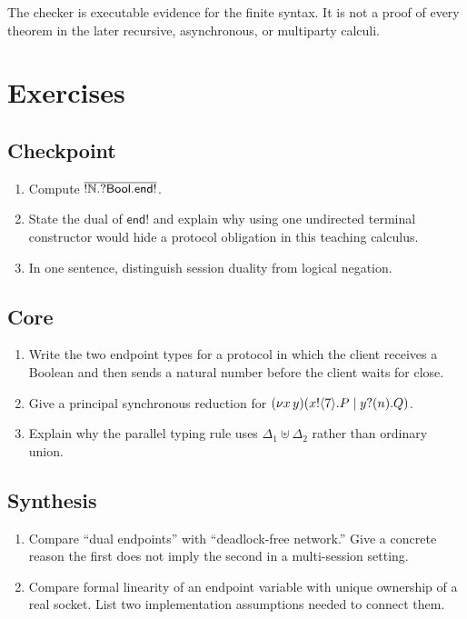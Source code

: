 The checker is executable evidence for the finite syntax. It is not a proof of every theorem in
the later recursive, asynchronous, or multiparty calculi.

\section{Exercises}

\subsection*{Checkpoint}
\begin{enumerate}[label=\textbf{2.\arabic*}]
\item Compute
\(\overline{!\mathbb{N}.?\mathsf{Bool}.\mathsf{end!}}\).
\item State the dual of \(\mathsf{end!}\) and explain why using one undirected terminal constructor
would hide a protocol obligation in this teaching calculus.
\item In one sentence, distinguish session duality from logical negation.
\end{enumerate}

\subsection*{Core}
\begin{enumerate}[label=\textbf{2.\arabic*},start=4]
\item Write the two endpoint types for a protocol in which the client receives a Boolean and then
sends a natural number before the client waits for close.
\item Give a principal synchronous reduction for
\((\nu x\,y)(x!\langle 7\rangle.P \mid y?(n).Q)\).
\item Explain why the parallel typing rule uses
\(\Delta_1\uplus\Delta_2\) rather than ordinary union.
\end{enumerate}

\subsection*{Synthesis}
\begin{enumerate}[label=\textbf{2.\arabic*},start=7]
\item Compare ``dual endpoints'' with ``deadlock-free network.'' Give a concrete reason the first
does not imply the second in a multi-session setting.
\item Compare formal linearity of an endpoint variable with unique ownership of a real socket.
List two implementation assumptions needed to connect them.
\end{enumerate}

